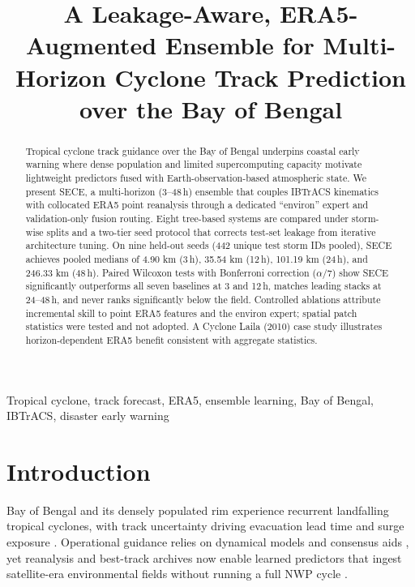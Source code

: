 \documentclass[conference]{IEEEtran}
\newcommand{\sece}{SECE}
\newcommand{\bob}{Bay of Bengal}
\newcommand{\era}{ERA5}
\newcommand{\ibtracs}{IBTrACS}
\newcommand{\km}{\,km}
\newcommand{\npooledstorms}{442}
\begin{document}
\title{A Leakage-Aware, \era{}-Augmented Ensemble for Multi-Horizon Cyclone Track Prediction over the Bay of Bengal}

\author{%
}

\maketitle

\begin{abstract}
Tropical cyclone track guidance over the \bob{} underpins coastal early warning where dense population and limited supercomputing capacity motivate lightweight predictors fused with Earth-observation-based atmospheric state.
We present \sece{}, a multi-horizon (3--48\,h) ensemble that couples \ibtracs{} kinematics with collocated \era{} point reanalysis through a dedicated ``environ'' expert and validation-only fusion routing.
Eight tree-based systems are compared under storm-wise splits and a two-tier seed protocol that corrects test-set leakage from iterative architecture tuning.
On nine held-out seeds (\npooledstorms{} unique test storm IDs pooled), \sece{} achieves pooled medians of 4.90\,\km{} (3\,h), 35.54\,\km{} (12\,h), 101.19\,\km{} (24\,h), and 246.33\,\km{} (48\,h).
Paired Wilcoxon tests with Bonferroni correction ($\alpha/7$) show \sece{} significantly outperforms all seven baselines at 3 and 12\,h, matches leading stacks at 24--48\,h, and never ranks significantly below the field.
Controlled ablations attribute incremental skill to point \era{} features and the environ expert; spatial patch statistics were tested and not adopted.
A Cyclone Laila (2010) case study illustrates horizon-dependent \era{} benefit consistent with aggregate statistics.
\end{abstract}

\begin{IEEEkeywords}
Tropical cyclone, track forecast, ERA5, ensemble learning, Bay of Bengal, IBTrACS, disaster early warning
\end{IEEEkeywords}

\section{Introduction}
 \bob{} and its densely populated rim experience recurrent landfalling tropical cyclones, with track uncertainty driving evacuation lead time and surge exposure \cite{paul2010,mohapatra2015}.
Operational guidance relies on dynamical models and consensus aids \cite{demaria2013,goerss2000}, yet reanalysis and best-track archives now enable learned predictors that ingest satellite-era environmental fields without running a full NWP cycle \cite{hersbach2020,knapp2010,walsh2015}.
\end{document}
